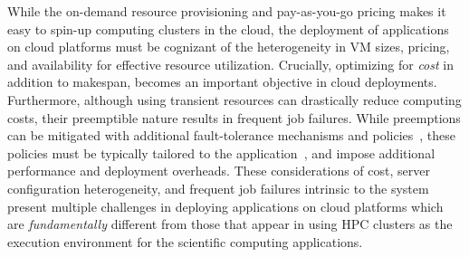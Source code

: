 

%
While the on-demand resource provisioning and pay-as-you-go pricing makes it easy to spin-up computing clusters in the cloud, the deployment of applications on cloud platforms must be cognizant of the heterogeneity in VM sizes, pricing, and availability for effective resource utilization. Crucially, optimizing for \emph{cost} in addition to makespan, becomes an important objective in cloud deployments. Furthermore, although using transient resources can drastically reduce computing costs, their preemptible nature results in frequent job failures. While preemptions can be mitigated with additional fault-tolerance mechanisms and policies~\cite{flint, marathe2014exploiting}, these policies must be typically tailored to the application~\cite{flint}, and impose additional performance and deployment overheads. 
These considerations of cost, server configuration heterogeneity, and frequent job failures intrinsic to the system present multiple challenges in deploying applications on cloud platforms which are \emph{fundamentally} different from those that appear in using HPC clusters as the execution environment for the scientific computing applications.

